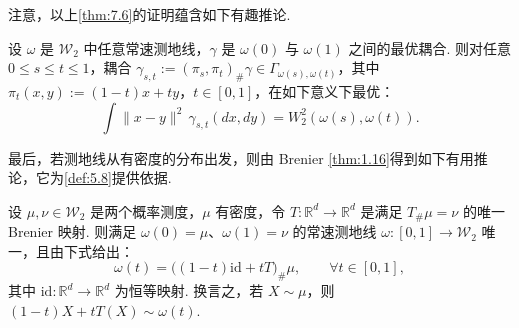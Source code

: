 注意，以上\autoref{thm:7.6}的证明蕴含如下有趣推论.
\begin{corollary}\label{cor:7.7}
设 $\omega$ 是 $\mathcal W_2$ 中任意常速测地线，$\gamma$ 是 $\omega(0)$ 与 $\omega(1)$ 之间的最优耦合. 则对任意 $0\le s\le t\le1$，耦合 $\gamma_{s,t}:=(\pi_s,\pi_t)_\#\gamma\in\Gamma_{\omega(s),\omega(t)}$，其中 $\pi_t(x,y):=(1-t)x+ty$，$t\in[0,1]$，在如下意义下最优：
$$\int\lVert x-y\rVert^2\,\gamma_{s,t}(dx,dy)=W_2^2(\omega(s),\omega(t)).$$
\end{corollary}
最后，若测地线从有密度的分布出发，则由 Brenier \autoref{thm:1.16}得到如下有用推论，它为\autoref{def:5.8}提供依据.
\begin{corollary}\label{cor:7.8}
设 $\mu,\nu\in\mathcal W_2$ 是两个概率测度，$\mu$ 有密度，令 $T:\mathbb R^d\to\mathbb R^d$ 是满足 $T_\#\mu=\nu$ 的唯一 Brenier 映射. 则满足 $\omega(0)=\mu$、$\omega(1)=\nu$ 的常速测地线 $\omega:[0,1]\to\mathcal W_2$ 唯一，且由下式给出：
$$\omega(t)=\bigl((1-t)\mathrm{id}+tT\bigr)_\#\mu,\qquad\forall t\in[0,1],$$
其中 $\mathrm{id}:\mathbb R^d\to\mathbb R^d$ 为恒等映射. 换言之，若 $X\sim\mu$，则 $(1-t)X+tT(X)\sim\omega(t)$.
\end{corollary}
